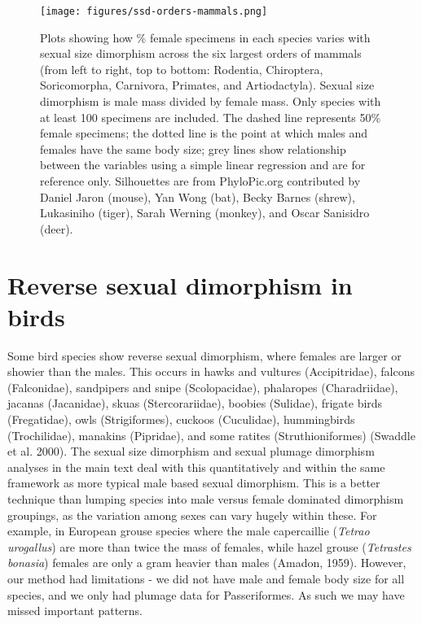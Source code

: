 \documentclass[a4paper, 12pt]{article}
\begin{document}
\begin{figure}[H]
 \centering
  \texttt{[image: figures/ssd-orders-mammals.png]}
  \caption{Plots showing how \% female specimens in each species varies with sexual size dimorphism across the six largest orders of mammals (from left to right, top to bottom: Rodentia, Chiroptera, Soricomorpha, Carnivora, Primates, and Artiodactyla). 
  Sexual size dimorphism is male mass divided by female mass. 
  Only species with at least 100 specimens are included. 
  The dashed line represents 50\% female specimens; the dotted line is the point at which males and females have the same body size; grey lines show relationship between the variables using a simple linear regression and are for reference only. 
  Silhouettes are from PhyloPic.org contributed by Daniel Jaron (mouse), Yan Wong (bat), Becky Barnes (shrew), Lukasiniho (tiger), Sarah Werning (monkey), and Oscar Sanisidro (deer).}
  \label{fig-mammal-ssd}
\end{figure}

\newpage



\newpage
\section{Reverse sexual dimorphism in birds}

Some bird species show reverse sexual dimorphism, where females are larger or showier than the males. 
This occurs in hawks and vultures (Accipitridae), falcons (Falconidae), sandpipers and snipe (Scolopacidae), phalaropes (Charadriidae), jacanas (Jacanidae), skuas (Stercorariidae), boobies (Sulidae), frigate birds (Fregatidae), owls (Strigiformes), cuckoos (Cuculidae), hummingbirds (Trochilidae), manakins (Pipridae), and some ratites (Struthioniformes) (Swaddle et al. 2000\cite{swaddle2000novel}). 
The sexual size dimorphism and sexual plumage dimorphism analyses in the main text deal with this quantitatively and within the same framework as more typical male based sexual dimorphism. 
This is a better technique than lumping species into male versus female dominated dimorphism groupings, as the variation among sexes can vary hugely within these. 
For example, in European grouse species where the male capercaillie (\textit{Tetrao urogallus}) are more than twice the mass of females, while hazel grouse (\textit{Tetrastes bonasia}) females are only a gram heavier than males (Amadon, 1959\cite{amadon59}). 
However, our method had limitations - we did not have male and female body size for all species, and we only had plumage data for Passeriformes. 
As such we may have missed important patterns.
\end{document}
